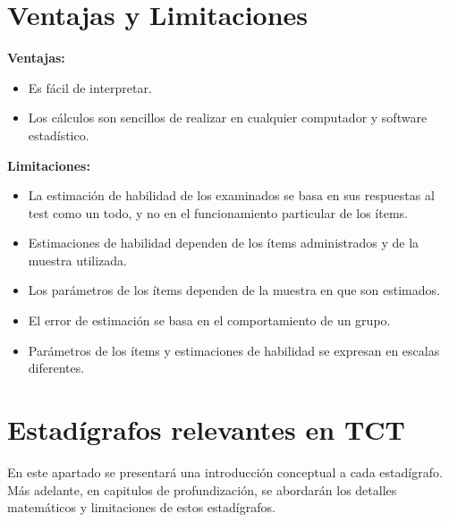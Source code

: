\documentclass[
  letterpaper,
  DIV=11,
  numbers=noendperiod]{scrreprt}
\providecommand{\tightlist}{%
  \setlength{\itemsep}{0pt}\setlength{\parskip}{0pt}}
\begin{document}
\section{\texorpdfstring{\textbf{Ventajas y
Limitaciones}}{Ventajas y Limitaciones}}\label{ventajas-y-limitaciones}

\textbf{Ventajas:}

\begin{itemize}
\tightlist
\item
  Es fácil de interpretar.
\item
  Los cálculos son sencillos de realizar en cualquier computador y
  software estadístico.
\end{itemize}

\textbf{Limitaciones:}

\begin{itemize}
\tightlist
\item
  La estimación de habilidad de los examinados se basa en sus respuestas
  al test como un todo, y no en el funcionamiento particular de los
  ítems.
\item
  Estimaciones de habilidad dependen de los ítems administrados y de la
  muestra utilizada.
\item
  Los parámetros de los ítems dependen de la muestra en que son
  estimados.
\item
  El error de estimación se basa en el comportamiento de un grupo.
\item
  Parámetros de los ítems y estimaciones de habilidad se expresan en
  escalas diferentes.
\end{itemize}

\section{Estadígrafos relevantes en
TCT}\label{estaduxedgrafos-relevantes-en-tct}

En este apartado se presentará una introducción conceptual a cada
estadígrafo. Más adelante, en capitulos de profundización, se abordarán
los detalles matemáticos y limitaciones de estos estadígrafos.
\end{document}
